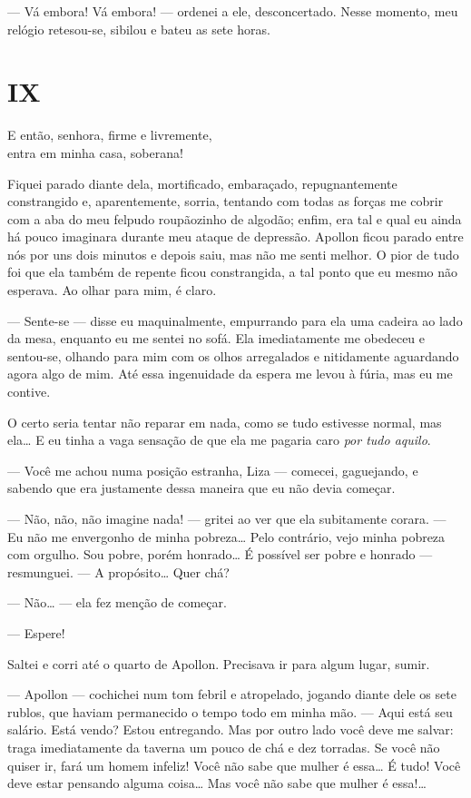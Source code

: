 --- Vá embora! Vá embora! --- ordenei a ele, desconcertado. Nesse momento,
meu relógio retesou-se, sibilou e bateu as sete horas.


\section{IX}

E então, senhora, firme e livremente,\\
entra em minha casa, soberana!


\noindent{}Fiquei parado diante dela, mortificado, embaraçado, repugnantemente
constrangido e, aparentemente, sorria, tentando com todas as forças me
cobrir com a aba do meu felpudo roupãozinho de algodão; enfim, era tal
e qual eu ainda há pouco imaginara durante meu ataque de depressão.
Apollon ficou parado entre nós por uns dois minutos e depois saiu, mas
não me senti melhor. O pior de tudo foi que ela também de repente ficou
constrangida, a tal ponto que eu mesmo não esperava. Ao olhar para mim,
é claro.

--- Sente-se --- disse eu maquinalmente, empurrando para ela uma cadeira ao
lado da mesa, enquanto eu me sentei no sofá. Ela imediatamente me
obedeceu e sentou-se, olhando para mim com os olhos arregalados e
nitidamente aguardando agora algo de mim. Até essa ingenuidade da
espera me levou à fúria, mas eu me contive.

O certo seria tentar não reparar em nada, como se tudo estivesse normal,
mas ela\ldots{} E eu tinha a vaga sensação de que ela me pagaria caro
\textit{por tudo aquilo}.

--- Você me achou numa posição estranha, Liza --- comecei, gaguejando, e
sabendo que era justamente dessa maneira que eu não devia começar.

--- Não, não, não imagine nada! --- gritei ao ver que ela subitamente
corara. --- Eu não me envergonho de minha pobreza\ldots{} Pelo contrário, vejo
minha pobreza com orgulho. Sou pobre, porém honrado\ldots{} É possível ser
pobre e honrado --- resmunguei. --- A propósito\ldots{} Quer chá?

--- Não\ldots{} --- ela fez menção de começar.

--- Espere!

Saltei e corri até o quarto de Apollon. Precisava ir para algum lugar,
sumir.

--- Apollon --- cochichei num tom febril e atropelado, jogando diante dele
os sete rublos, que haviam permanecido o tempo todo em minha mão. ---
Aqui está seu salário. Está vendo? Estou entregando. Mas por outro lado
você deve me salvar: traga imediatamente da taverna um pouco de chá e
dez torradas. Se você não quiser ir, fará um homem infeliz! Você não
sabe que mulher é essa\ldots{} É tudo! Você deve estar pensando alguma
coisa\ldots{} Mas você não sabe que mulher é essa!\ldots{}

